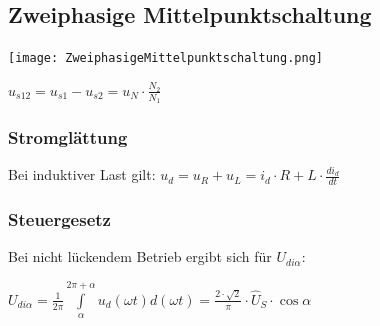 \documentclass[german]{latex4ei/latex4ei_sheet}
\begin{document}
\begin{sectionbox}
		\subsection{Zweiphasige Mittelpunktschaltung}
			\texttt{[image: ZweiphasigeMittelpunktschaltung.png]}
				\begin{symbolbox}
					\item $u_{s12} = u_{s1}-u_{s2} = u_N \cdot \frac{N_2}{N_1}$
				\end{symbolbox}
			\subsubsection{Stromglättung}
				Bei induktiver Last gilt: $u_d = u_R + u_L = i_d\cdot R+L\cdot \frac{di_d}{dt}$
			\subsubsection{Steuergesetz}
				\begin{bluebox}
					\item Bei nicht lückendem Betrieb ergibt sich für $U_{di\alpha}$:
					\item  $U_{di\alpha} = \frac{1}{2\pi}\int\limits_\alpha^{2\pi+\alpha}u_d(\omega t)d(\omega  t) = \frac{2\cdot \sqrt{2}}{\pi}\cdot \hat{U}_S \cdot \cos \alpha$
				\end{bluebox}
			
			
				

	\end{sectionbox}
\end{document}
